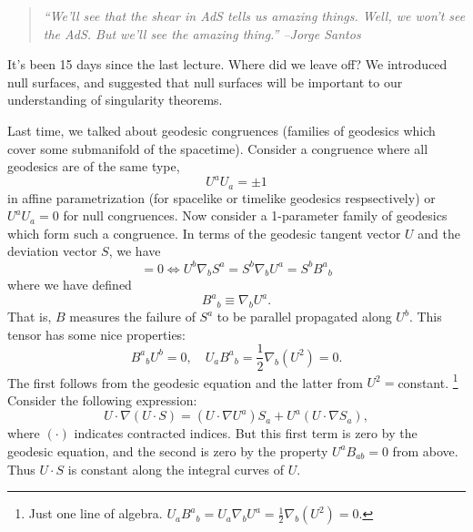 \begin{quote}
    \textit{``We'll see that the shear in AdS tells us amazing things. Well, we won't see the AdS. But we'll see the amazing thing.'' --Jorge Santos}
\end{quote}
It's been 15 days since the last lecture. Where did we leave off? We introduced null surfaces, and suggested that null surfaces will be important to our understanding of singularity theorems.

Last time, we talked about geodesic congruences (families of geodesics which cover some submanifold of the spacetime). Consider a congruence where all geodesics are of the same type,
\begin{equation*}
    U^a U_a = \pm 1
\end{equation*}
in affine parametrization (for spacelike or timelike geodesics respsectively) or $U^a U_a =0$ for null congruences.
Now consider a 1-parameter family of geodesics which form such a congruence. In terms of the geodesic tangent vector $U$ and the deviation vector $S$, we have
\begin{equation}
    [S,U]=0\iff U^b \nabla_b S^a = S^b \nabla_b U^a = S^b B^a{}_b
\end{equation}
where we have defined
\begin{equation}
    B^a{}_b \equiv \nabla_b U^a.
\end{equation}
That is, $B$ measures the failure of $S^a$ to be parallel propagated along $U^b$. This tensor has some nice properties:
\begin{equation}
    B^a{}_b U^b =0, \quad U_a B^a{}_b = \frac{1}{2} \nabla_b(U^2)=0.
\end{equation}
The first follows from the geodesic equation and the latter from $U^2={}$constant.%
    \footnote{Just one line of algebra. $U_a B^a{}_b=U_a \nabla_b U^a = \frac{1}{2} \nabla_b(U^2)=0$.}
Consider the following expression:
\begin{equation}
     U\cdot \nabla(U\cdot S) = (U\cdot \nabla U^a) S_a + U^a (U\cdot \nabla S_a),
\end{equation}
where $(\cdot)$ indicates contracted indices. But this first term is zero by the geodesic equation, and the second is zero by the property $U^a B_{ab}=0$ from above. Thus $U\cdot S$ is constant along the integral curves of $U$.

